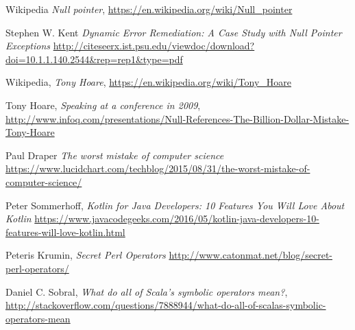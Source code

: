 \documentclass[a4paper,12pt]{article}
\begin{document}
\newpage

\begin{thebibliography}{56}
	
    Wikipedia
    \textit{Null pointer},
    \url{https://en.wikipedia.org/wiki/Null_pointer}

    Stephen W. Kent
    \textit{Dynamic Error Remediation: A Case Study with Null Pointer Exceptions}
    \url{http://citeseerx.ist.psu.edu/viewdoc/download?doi=10.1.1.140.2544&rep=rep1&type=pdf}

	Wikipedia,
	\textit{Tony Hoare},
	\url{https://en.wikipedia.org/wiki/Tony_Hoare}
	
	Tony Hoare,
	\textit{Speaking at a conference in 2009},
	\url{http://www.infoq.com/presentations/Null-References-The-Billion-Dollar-Mistake-Tony-Hoare}

    Paul Draper
    \textit{The worst mistake of computer science}
    \url{https://www.lucidchart.com/techblog/2015/08/31/the-worst-mistake-of-computer-science/}

 	Peter Sommerhoff,
 	\textit{Kotlin for Java Developers: 10 Features You Will Love About Kotlin}
 	\url{https://www.javacodegeeks.com/2016/05/kotlin-java-developers-10-features-will-love-kotlin.html}

	Peteris Krumin,
	\textit{Secret Perl Operators}
	\url{http://www.catonmat.net/blog/secret-perl-operators/}

	Daniel C. Sobral,
	\textit{What do all of Scala's symbolic operators mean?},
	\url{http://stackoverflow.com/questions/7888944/what-do-all-of-scalas-symbolic-operators-mean}

\end{thebibliography}
\end{document}

